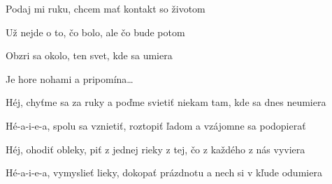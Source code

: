 \begin{song}
\bigskip

    \par
{}    \par

\bigskip

 Podaj mi ruku, chcem mať kontakt so životom \par
{} Už nejde o to, čo bolo, ale čo bude potom \par
{} Obzri sa okolo, ten svet, kde sa umiera \par
{} Je hore nohami a pripomína… \par

\bigskip

Héj, chyťme sa za ruky a poďme svietiť niekam tam, kde sa dnes neumiera \par
{} Hé-a-i-e-a,  spolu sa vznietiť,  roztopiť ľadom a vzájomne sa podopierať \par
{} Héj, ohodiť obleky, piť z jednej rieky z tej, čo z každého z nás vyviera \par
{} Hé-a-i-e-a,  vymyslieť lieky,  dokopať prázdnotu a nech si v kľude odumiera \par

\bigskip

     \par

\end{song}
